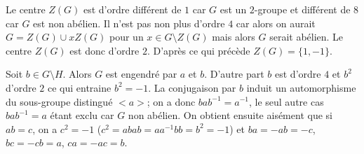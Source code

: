 {{\hskip 5mm Le centre $Z(G)$ est d'ordre diff\'erent de $1$ car $G$ est un
$2$-groupe et diff\'erent de $8$ car $G$ est non ab\'elien. Il n'est pas non plus
d'ordre $4$ car alors on aurait $G=Z(G) \cup x Z(G)$ pour un $x\in G\setminus
Z(G)$ mais alors $G$ serait ab\'elien. Le centre $Z(G)$ est donc d'ordre $2$.
D'apr\`es ce qui pr\'ec\`ede $Z(G)=\{1,-1\}$. 

\hskip 5mm Soit $b\in G\setminus H$. Alors $G$ est engendr\'e par
$a$ et $b$. D'autre part $b$ est d'ordre $4$ et $b^2$ d'ordre $2$ ce qui
entraine $b^2=-1$. La conjugaison par $b$ induit un automorphisme du sous-groupe
distingu\'e $<a>$; on a donc $bab^{-1} = a^{-1}$, le seul autre cas $bab^{-1} = a$
\'etant exclu car $G$ non ab\'elien. On obtient ensuite ais\'ement que si $ab=c$, 
on a $c^2=-1$ ($c^2=abab=aa^{-1}bb=b^2=-1$) et $ba=-ab=-c$, $bc=-cb=a$,
$ca=-ac=b$.
}
}
